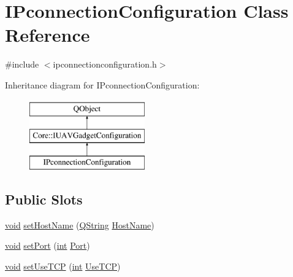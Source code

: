 \hypertarget{class_i_pconnection_configuration}{\section{I\-Pconnection\-Configuration Class Reference}
\label{class_i_pconnection_configuration}
}


{\ttfamily \#include $<$ipconnectionconfiguration.\-h$>$}

Inheritance diagram for I\-Pconnection\-Configuration\-:\begin{figure}[H]
\begin{center}
\leavevmode
\includegraphics[height=3.000000cm]{class_i_pconnection_configuration}
\end{center}
\end{figure}
\subsection*{Public Slots}
\begin{DoxyCompactItemize}
\item 
\hyperlink{group___u_a_v_objects_plugin_ga444cf2ff3f0ecbe028adce838d373f5c}{void} \hyperlink{group___i_p_conn_plugin_ga88855a0ecb5df4caaf47450815ff761a}{set\-Host\-Name} (\hyperlink{group___u_a_v_objects_plugin_gab9d252f49c333c94a72f97ce3105a32d}{Q\-String} \hyperlink{group___i_p_conn_plugin_gaa540a20af79b7ec845405fb81a75dd82}{Host\-Name})
\item 
\hyperlink{group___u_a_v_objects_plugin_ga444cf2ff3f0ecbe028adce838d373f5c}{void} \hyperlink{group___i_p_conn_plugin_gacce8d065ea6dd85639e0e1aea893ce9c}{set\-Port} (\hyperlink{ioapi_8h_a787fa3cf048117ba7123753c1e74fcd6}{int} \hyperlink{group___i_p_conn_plugin_ga016b44f60ba95951cdf428d88a119a97}{Port})
\item 
\hyperlink{group___u_a_v_objects_plugin_ga444cf2ff3f0ecbe028adce838d373f5c}{void} \hyperlink{group___i_p_conn_plugin_ga58320607e7ef94199aa35fd7b7b4df21}{set\-Use\-T\-C\-P} (\hyperlink{ioapi_8h_a787fa3cf048117ba7123753c1e74fcd6}{int} \hyperlink{group___i_p_conn_plugin_ga40b7a131ca4ee4e1c315a0fc12281da8}{Use\-T\-C\-P})
\end{DoxyCompactItemize}
